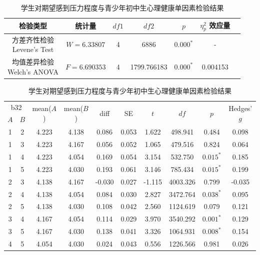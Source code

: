 \documentclass[zihao = -4, linespread = 1.5]{article}
\begin{document}
\begin{table}[htbp]
    \centering
    \setlength{\tabcolsep}{8pt}
    \renewcommand{\arraystretch}{1.2}
    \caption{学生对期望感到压力程度与青少年初中生心理健康单因素检验结果}\label{table-anova-pressure-health}
    \begin{tabular}{ccccccc}
        \bottomrule[1.5pt]
        检验类型 & 统计量 & $df1$ & $df2$ & $p$ & $\eta^2_p$ 效应量 \\
        \midrule[0.75pt]
        \makecell{方差齐性检验 \\ Levene's Test} & $W=6.33807$ & 4 & 6886 & $\bm{0.000^{*}}$ & - \\
        \midrule[0.75pt]
        \makecell{均值差异检验 \\ Welch's ANOVA} & $F=6.690353$ & 4 & 1799.766183 & $\bm{0.000^{*}}$ & 0.004153 \\
    \end{tabular}
    \setlength{\tabcolsep}{6pt}
    \renewcommand{\arraystretch}{1.2}
    \begin{tabular}{cccccccccc}
        \bottomrule[1.5pt]
        \multicolumn{2}{c}{b32} & \multirow{2}{*}{mean($A$)} & \multirow{2}{*}{mean($B$)} & \multirow{2}{*}{diff} & \multirow{2}{*}{SE} & \multirow{2}{*}{$t$} & \multirow{2}{*}{$df$} & \multirow{2}{*}{$p$} & \multirow{2}{*}{Hedges' $g$} \\
        \cmidrule[0.75pt](lr){1-2}
        $A$ & $B$ \\
        \midrule[0.75pt]
        1 & 2 & 4.223 & 4.138 & 0.086 & 0.053 & 1.622 & 498.941 & 0.484 & 0.098 \\
        1 & 3 & 4.223 & 4.167 & 0.056 & 0.052 & 1.065 & 479.516 & 0.824 & 0.064 \\
        1 & 4 & 4.223 & 4.054 & 0.169 & 0.054 & 3.154 & 532.750 & $\bm{0.015^{*}}$ & 0.185 \\
        1 & 5 & 4.223 & 4.030 & 0.193 & 0.061 & 3.146 & 785.434 & $\bm{0.015^{*}}$ & 0.199 \\
        2 & 3 & 4.138 & 4.167 & -0.030 & 0.027 & -1.115 & 4003.326 & 0.799 & -0.035 \\
        2 & 4 & 4.138 & 4.054 & 0.084 & 0.030 & 2.827 & 3472.764 & $\bm{0.038^{*}}$ & 0.095 \\
        2 & 5 & 4.138 & 4.030 & 0.108 & 0.042 & 2.560 & 1124.619 & 0.079 & 0.121 \\
        3 & 4 & 4.167 & 4.054 & 0.114 & 0.029 & 3.970 & 3540.292 & $\bm{0.001^{*}}$ & 0.129 \\
        3 & 5 & 4.167 & 4.030 & 0.138 & 0.041 & 3.326 & 1064.931 & $\bm{0.008^{*}}$ & 0.154 \\
        4 & 5 & 4.054 & 4.030 & 0.024 & 0.043 & 0.556 & 1226.566 & 0.981 & 0.026 \\
        \toprule[1.5pt]
    \end{tabular}
\end{table}
\end{document}
